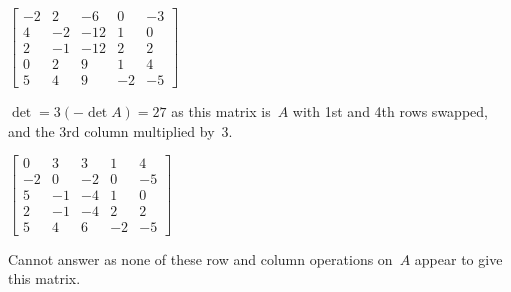 \begin{example}
\begin{parts}
\item \(\begin{bmatrix}-2&2&-6&0&-3
\\4&-2&-12&1&0
\\2&-1&-12&2&2
\\0&2&9&1&4
\\5&4&9&-2&-5\end{bmatrix}\)
\begin{solution} 
\(\det=3(-\det A)=27\) as this matrix is~\(A\) with 1st and 4th rows swapped, and the 3rd column multiplied by~\(3\). 
\end{solution}

\item \(\begin{bmatrix}0&3&3&1&4
\\-2&0&-2&0&-5
\\5&-1&-4&1&0
\\2&-1&-4&2&2
\\5&4&6&-2&-5\end{bmatrix}\)
\begin{solution} 
Cannot answer as none of these row and column operations on~\(A\) appear to give this matrix.
\end{solution}

\end{parts}
\end{example}



